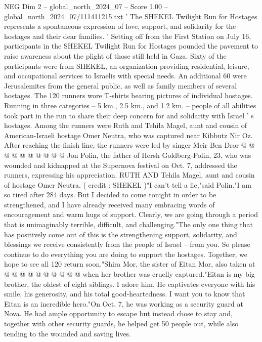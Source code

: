 \begin{textsample}{NEG Dim 2 – global\_north\_2024\_07 – Score 1.00 – global\_north\_2024\_07/111411215.txt}  \label{ex:f2_neg_260}
' The SHEKEL Twilight Run for Hostages represents a spontaneous expression of love, support, and solidarity for the hostages and their dear families. ' Setting off from the First Station on July 16, participants in the SHEKEL Twilight Run for Hostages pounded the pavement to raise awareness about the plight of those still held in Gaza.
Sixty of the participants were from SHEKEL, an organization providing residential, leisure, and occupational services to Israelis with special needs.
An additional 60 were Jerusalemites from the general public, as well as family members of several hostages.
The 120 runners wore T-shirts bearing pictures of individual hostages.
Running in three categories -- 5 km., 2.5 km., and 1.2 km. -- people of all abilities took part in the run to share their deep concern for and solidarity with Israel ' s hostages.
Among the runners were Ruth and Tehila Magel, aunt and cousin of American-Israeli hostage Omer Neutra, who was captured near Kibbutz Nir Oz.
After reaching the finish line, the runners were led by singer Meir Ben Dror @ @ @ @ @ @ @ @ @ @ Jon Polin, the father of Hersh Goldberg-Polin, 23, who was wounded and kidnapped at the Supernova festival on Oct. 7, addressed the runners, expressing his appreciation.
RUTH AND Tehila Magel, aunt and cousin of hostage Omer Neutra. ( credit : SHEKEL )"I can't tell a lie,"said Polin."I am so tired after 284 days.
But I decided to come tonight in order to be strengthened, and I have already received many embracing words of encouragement and warm hugs of support.
Clearly, we are going through a period that is unimaginably terrible, difficult, and challenging."The only one thing that has positively come out of this is the strengthening support, solidarity, and blessings we receive consistently from the people of Israel -- from you.
So please continue to do everything you are doing to support the hostages.
Together, we hope to see all 120 return soon."Shira Mor, the sister of Eitan Mor, also taken at @ @ @ @ @ @ @ @ @ @ when her brother was cruelly captured."Eitan is my big brother, the oldest of eight siblings.
I adore him.
He captivates everyone with his smile, his generosity, and his total good-heartedness.
I want you to know that Eitan is an incredible hero."On Oct. 7, he was working as a security guard at Nova.
He had ample opportunity to escape but instead chose to stay and, together with other security guards, he helped get 50 people out, while also tending to the wounded and saving lives.

\end{textsample}
